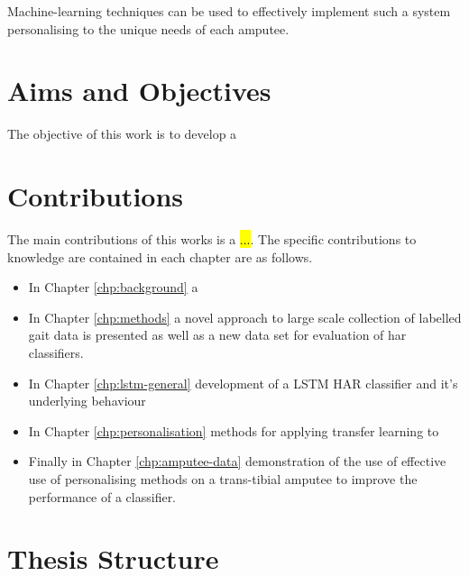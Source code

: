 Machine-learning techniques can be used to effectively implement such a system personalising to the unique needs of each amputee.


\section{Aims and Objectives}
The objective of this work is to develop a


\section{Contributions}
The main contributions of this works is a \hl{...}. The specific contributions to knowledge are
contained in each chapter are as follows.

\begin{itemize}
    \item In Chapter \ref{chp:background} a
    
    \item In Chapter \ref{chp:methods} a novel approach to large scale collection of labelled gait data is presented as well as a new data set for evaluation of \acrshort{har} classifiers.
    
    \item In Chapter \ref{chp:lstm-general} development of a LSTM HAR classifier and it's underlying behaviour
    
    \item In Chapter \ref{chp:personalisation} methods for applying transfer learning to 
    
    \item Finally in Chapter \ref{chp:amputee-data} demonstration of the use of effective use of personalising methods on a trans-tibial amputee to improve the performance of a classifier.
\end{itemize}

\section{Thesis Structure}
